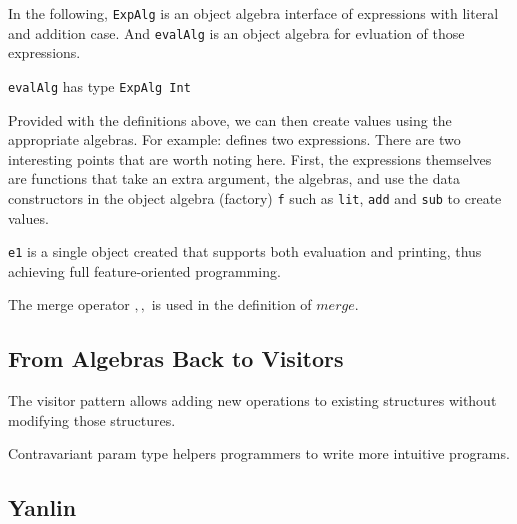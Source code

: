 In the following, \lstinline{ExpAlg} is an object algebra interface of
expressions with literal and addition case. And \lstinline{evalAlg} is an object
algebra for evluation of those expressions.


\lstinline{evalAlg} has type \lstinline{ExpAlg Int}


Provided with the definitions above, we can then create values using the
appropriate algebras. For example:
defines two expressions. There are two interesting points that are worth noting here.
First, the expressions themselves are functions that take an extra argument, the
algebras, and use the data constructors in the object algebra (factory)
\lstinline{f} such as \lstinline{lit}, \lstinline{add}  and \lstinline{sub}
to create values.


\lstinline{e1} is a single object created that supports both evaluation and
printing, thus achieving full feature-oriented programming.

The merge operator $ ,, $ is used in the definition of $ merge $.

\subsection{From Algebras Back to Visitors}

The visitor pattern allows adding new operations to existing structures without
modifying those structures.



Contravariant param type helpers programmers to write more intuitive programs.

\subsection{Yanlin}

